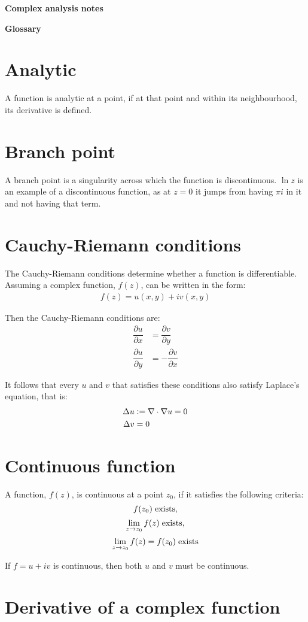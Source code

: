 \documentclass[12pt,a4paper]{article}
\newcommand{\labsec}[1]{\section{#1}
	\label{sec:#1}}
\newcommand{\defeq}{\vcentcolon=}
\begin{document}
	{\Huge \textbf{Complex analysis notes}}
	
	\tableofcontents
	\newpage
	
	{\LARGE \textbf{Glossary}}
	
	\labsec{Analytic}
	
	A function is analytic at a point, if at that point and within its neighbourhood, its derivative is defined.
	
	\labsec{Branch point}
	
	A branch point is a singularity across which the function is discontinuous. $\ln{z}$ is an example of a discontinuous function, as at $z=0$ it jumps from having $\pi i$ in it and not having that term.
	
	\labsec{Cauchy-Riemann conditions}
	
	The Cauchy-Riemann conditions determine whether a function is differentiable. Assuming a complex function, $f(z)$, can be written in the form:
	\begin{align*}
		f(z) = u(x,y) + iv(x,y)
	\end{align*}

	Then the Cauchy-Riemann conditions are:
	\begin{align*}
		\dfrac{\partial u}{\partial x} &= \dfrac{\partial v}{\partial y} \\
		\dfrac{\partial u}{\partial y} &= - \dfrac{\partial v}{\partial x}
	\end{align*}

	It follows that every $u$ and $v$ that satisfies these conditions also satisfy Laplace's equation, that is:
	\begin{align}
	\Delta u &\defeq \nabla \cdot \nabla u = 0 \\
	\Delta v &= 0
	\end{align}

	\labsec{Continuous function}
	
	A function, $f(z)$, is continuous at a point $z_0$, if it satisfies the following criteria:
	\[
		f(z_0) \hspace{0.1cm}\mathrm{exists,}
	\]
	\[
		\lim_{z\rightarrow z_0} f(z) \hspace{0.1cm}\mathrm{exists,}
	\]
	\[
		\lim_{z\rightarrow z_0} f(z) = f(z_0)
		\hspace{0.1cm}\mathrm{exists}
	\]
	
	If $f = u + iv$ is continuous, then both $u$ and $v$ must be continuous.

	\labsec{Derivative of a complex function}
	
\end{document}

